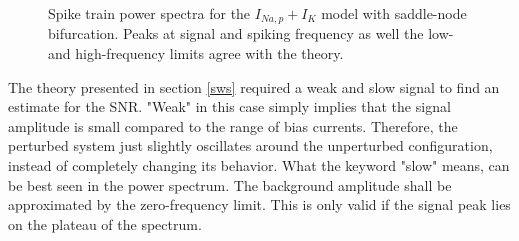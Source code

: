 \documentclass[12pt,a4paper]{article}
\begin{document}
\begin{figure}[H]
	\label{snspec}
	\hspace*{-0.5cm}
	\caption{Spike train power spectra for the $I_{Na,p}+I_K$ model with saddle-node bifurcation. Peaks at signal and spiking frequency as well the low- and high-frequency limits agree with the theory.}
\end{figure}
The theory presented in section \ref{sws} required a weak and slow signal to find an estimate for the SNR. "Weak" in this case simply implies that the signal amplitude is small compared to the range of bias currents. Therefore, the perturbed system just slightly oscillates around the unperturbed configuration, instead of completely changing its behavior. What the keyword "slow" means, can be best seen in the power spectrum. The background amplitude shall be approximated by the zero-frequency limit. This is only valid if the signal peak lies on the plateau of the spectrum.\\
\end{document}
